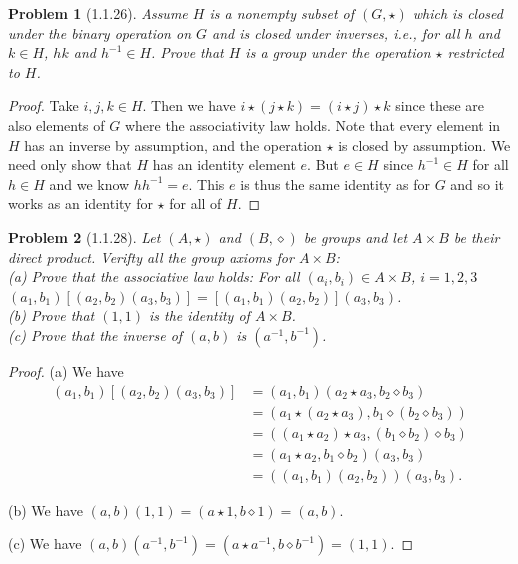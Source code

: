 \documentclass{article}
\newtheorem{problem}{Problem}
\begin{document}
\begin{problem}[1.1.26]
Assume $H$ is a nonempty subset of $(G, \star)$ which is closed under the binary operation on $G$ and is closed under inverses, i.e., for all $h$ and $k \in H$, $hk$ and $h^{-1} \in H$. Prove that $H$ is a group under the operation $\star$ restricted to $H$.
\end{problem}
\begin{proof}
Take $i,j,k \in H$. Then we have $i \star (j \star k) = (i \star j) \star k$ since these are also elements of $G$ where the associativity law holds. Note that every element in $H$ has an inverse by assumption, and the operation $\star$ is closed by assumption. We need only show that $H$ has an identity element $e$. But $e \in H$ since $h^{-1} \in H$ for all $h \in H$ and we know $hh^{-1} = e$. This $e$ is thus the same identity as for $G$ and so it works as an identity for $\star$ for all of $H$.
\end{proof}

\begin{problem}[1.1.28]
Let $(A, \star)$ and $(B, \diamond)$ be groups and let $A \times B$ be their direct product. Verifty all the group axioms for $A \times B$:\\
(a) Prove that the associative law holds: For all $(a_i, b_i) \in A \times B$, $i = 1,2,3$ $(a_1,b_1) [(a_2,b_2)(a_3,b_3)] = [(a_1,b_1)(a_2,b_2)](a_3,b_3)$.\\
(b) Prove that $(1, 1)$ is the identity of $A \times B$.\\
(c) Prove that the inverse of $(a,b)$ is $(a^{-1}, b^{-1})$.
\end{problem}
\begin{proof}
(a) We have
\begin{align*}
(a_1,b_1) [(a_2,b_2)(a_3,b_3)]
&= (a_1,b_1)(a_2 \star a_3, b_2 \diamond b_3) \\
&= (a_1 \star (a_2 \star a_3), b_1 \diamond (b_2 \diamond b_3)) \\
&= ((a_1 \star a_2) \star a_3, (b_1 \diamond b_2) \diamond b_3) \\
&= (a_1 \star a_2, b_1 \diamond b_2)(a_3, b_3) \\
&= ((a_1, b_1)(a_2,b_2))(a_3, b_3).
\end{align*}

(b) We have $(a,b)(1,1) = (a \star 1, b \diamond 1) = (a, b)$.

(c) We have $(a,b)(a^{-1},b^{-1}) = (a \star a^{-1}, b \diamond b^{-1}) = (1,1)$.
\end{proof}
\end{document}

